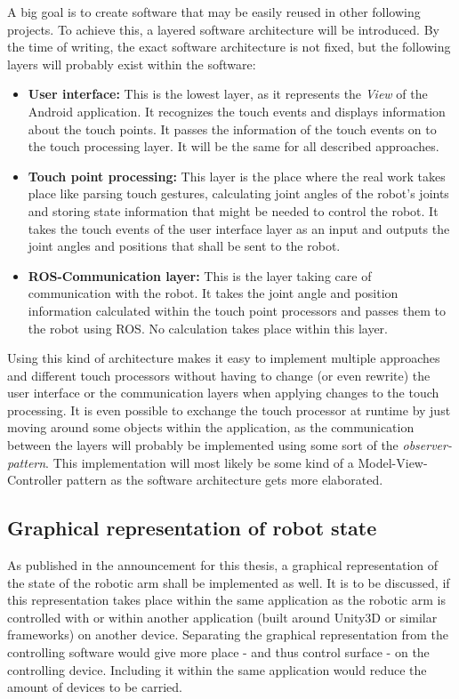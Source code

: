\documentclass[a4paper]{article}
\begin{document}
A big goal is to create software that may be easily reused in other following projects. To achieve this, a layered software architecture will be introduced. By the time of writing, the exact software architecture is not fixed, but the following layers will probably exist within the software:
\begin{itemize}
	\item \textbf{User interface:} This is the lowest layer, as it represents the \textit{View} of the Android application. It recognizes the touch events and displays information about the touch points. It passes the information of the touch events on to the touch processing layer. It will be the same for all described approaches.
	\item \textbf{Touch point processing:} This layer is the place where the real work takes place like parsing touch gestures, calculating joint angles of the robot's joints and storing state information that might be needed to control the robot. It takes the touch events of the user interface layer as an input and outputs the joint angles and positions that shall be sent to the robot.
	\item \textbf{ROS-Communication layer:} This is the layer taking care of communication with the robot. It takes the joint angle and position information calculated within the touch point processors and passes them to the robot using ROS. No calculation takes place within this layer.
\end{itemize}

Using this kind of architecture makes it easy to implement multiple approaches and different touch processors without having to change (or even rewrite) the user interface or the communication layers when applying changes to the touch processing. It is even possible to exchange the touch processor at runtime by just moving around some objects within the application, as the communication between the layers will probably be implemented using some sort of the \textit{observer-pattern}. This implementation will most likely be some kind of a Model-View-Controller pattern as the software architecture gets more elaborated.

\subsection{Graphical representation of robot state}

As published in the announcement for this thesis, a graphical representation of the state of the robotic arm shall be implemented as well. It is to be discussed, if this representation takes place within the same application as the robotic arm is controlled with or within another application (built around Unity3D or similar frameworks) on another device. Separating the graphical representation from the controlling software would give more place - and thus control surface - on the controlling device. Including it within the same application would reduce the amount of devices to be carried.
\end{document}
